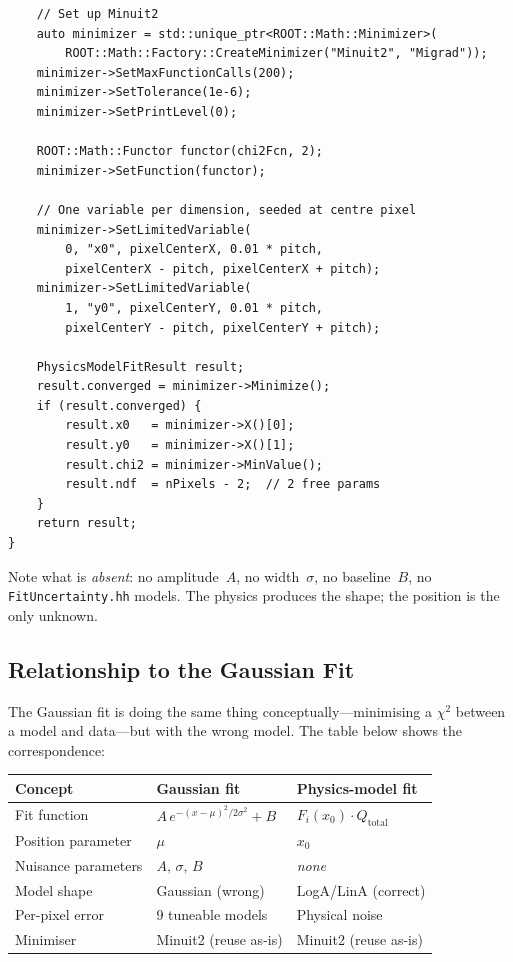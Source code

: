 \documentclass[11pt,a4paper]{article}
\newcommand{\file}[1]{\texttt{#1}}
\begin{document}
\begin{lstlisting}
    // Set up Minuit2
    auto minimizer = std::unique_ptr<ROOT::Math::Minimizer>(
        ROOT::Math::Factory::CreateMinimizer("Minuit2", "Migrad"));
    minimizer->SetMaxFunctionCalls(200);
    minimizer->SetTolerance(1e-6);
    minimizer->SetPrintLevel(0);

    ROOT::Math::Functor functor(chi2Fcn, 2);
    minimizer->SetFunction(functor);

    // One variable per dimension, seeded at centre pixel
    minimizer->SetLimitedVariable(
        0, "x0", pixelCenterX, 0.01 * pitch,
        pixelCenterX - pitch, pixelCenterX + pitch);
    minimizer->SetLimitedVariable(
        1, "y0", pixelCenterY, 0.01 * pitch,
        pixelCenterY - pitch, pixelCenterY + pitch);

    PhysicsModelFitResult result;
    result.converged = minimizer->Minimize();
    if (result.converged) {
        result.x0   = minimizer->X()[0];
        result.y0   = minimizer->X()[1];
        result.chi2 = minimizer->MinValue();
        result.ndf  = nPixels - 2;  // 2 free params
    }
    return result;
}
\end{lstlisting}

\noindent
Note what is \emph{absent}: no amplitude~$A$, no width~$\sigma$, no
baseline~$B$, no \file{FitUncertainty.hh} models.  The physics produces
the shape; the position is the only unknown.

\subsection{Relationship to the Gaussian Fit}
\label{sec:relationship}

The Gaussian fit is doing the same thing conceptually---minimising a
$\chi^{2}$ between a model and data---but with the wrong model.  The
table below shows the correspondence:

\medskip
\begin{center}
\begin{tabular}{@{}lll@{}}
\toprule
\textbf{Concept} & \textbf{Gaussian fit} & \textbf{Physics-model fit} \\
\midrule
Fit function
  & $A\, e^{-(x-\mu)^{2}/2\sigma^{2}} + B$
  & $F_i(x_0) \cdot Q_{\text{total}}$ \\[2pt]
Position parameter
  & $\mu$
  & $x_0$ \\[2pt]
Nuisance parameters
  & $A,\, \sigma,\, B$
  & \emph{none} \\[2pt]
Model shape
  & Gaussian (wrong)
  & LogA/LinA (correct) \\[2pt]
Per-pixel error
  & 9 tuneable models
  & Physical noise \\[2pt]
Minimiser
  & Minuit2 (reuse as-is)
  & Minuit2 (reuse as-is) \\
\bottomrule
\end{tabular}
\end{center}
\end{document}
